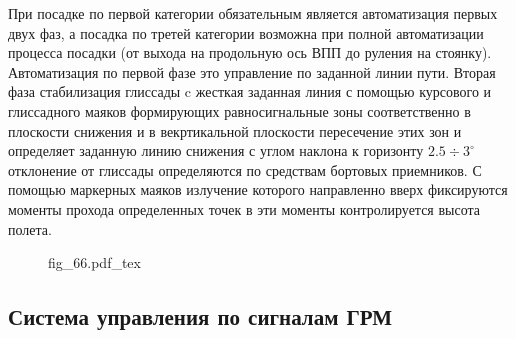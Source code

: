 \documentclass{article}
\newcommand{\incfig}[1]{
    {#1.pdf_tex}
}
\begin{document}
При посадке по первой категории обязательным является автоматизация первых двух фаз, а посадка по третей категории возможна при полной автоматизации процесса посадки (от выхода на продольную ось ВПП до руления на стоянку).
Автоматизация по первой фазе это управление по заданной линии пути. Вторая фаза стабилизация глиссады c жесткая заданная линия с помощью курсового и глиссадного маяков формирующих равносигнальные зоны соответственно в плоскости снижения и в векртикальной плоскости пересечение этих зон и определяет заданную линию снижения с углом наклона к горизонту $2.5 \div 3^\circ$ отклонение от глиссады определяются по средствам бортовых приемников.
С помощью маркерных маяков излучение которого направленно вверх фиксируются моменты прохода определенных точек в эти моменты контролируется высота полета. 
\begin{figure}[H]
    \centering
    \incfig{fig_66}
    \label{fig:fig_66}
\end{figure}
\subsection{Система управления по сигналам ГРМ}
\end{document}
